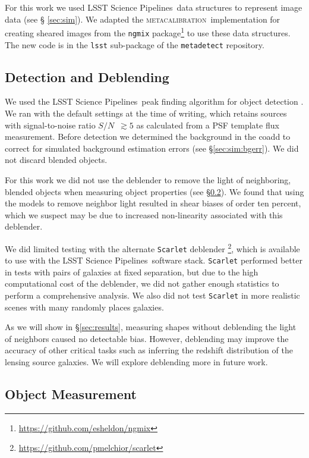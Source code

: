 \documentclass[twocolumn,twocolappendix,astrosym]{openjournal}
\newcommand{\snr}{$S/N$}
\newcommand{\dm}{LSST Science Pipelines}
\newcommand{\mcal}{\textsc{metacalibration}}
\begin{document}
For this work we used \dm\ data structures to represent image data (see \S
\ref{sec:sim}).  We adapted the \mcal\ implementation for creating sheared
images from the \texttt{ngmix}
package\footnote{\url{https://github.com/esheldon/ngmix}} to use these data
structures.  The new code is in the \texttt{lsst} sub-package of
the \texttt{metadetect} repository.


\subsection{Detection and Deblending} \label{sec:mdet:detect}

We used the \dm\ peak finding algorithm for object detection
\citep{BoschHSC2017}.  We ran with the default settings at the time of writing,
which retains sources with signal-to-noise ratio \snr\ $\gtrsim 5$ as
calculated from a PSF template flux measurement.  Before detection we
determined the background in the coadd to correct for simulated background
estimation errors (see \S \ref{sec:sim:bgerr}).  We did not discard blended
objects.

For this work we did not use the deblender to remove the light of neighboring,
blended objects when measuring object properties (see \S \ref{sec:mdet:meas}).
We found that using the models to remove neighbor light resulted in shear
biases of order ten percent, which we suspect may be due to increased
non-linearity associated with this deblender.

We did limited testing with the alternate \texttt{Scarlet} deblender
\citep{MelchiorScarlet2018}\footnote{\url{https://github.com/pmelchior/scarlet}},
which is available to use with the \dm\ software stack. \texttt{Scarlet}
performed better in tests with pairs of galaxies at fixed
separation, but due to the high computational cost of the deblender, we did not
gather enough statistics to perform a comprehensive analysis.  We also did not
test \texttt{Scarlet} in more realistic scenes with many randomly places
galaxies.

As we will show in \S \ref{sec:results}, measuring shapes without deblending
the light of neighbors caused no detectable bias.  However, deblending may
improve the accuracy of other critical tasks such as inferring the redshift
distribution of the lensing source galaxies.  We will explore deblending more
in future work.

\subsection{Object Measurement} \label{sec:mdet:meas}
\end{document}
